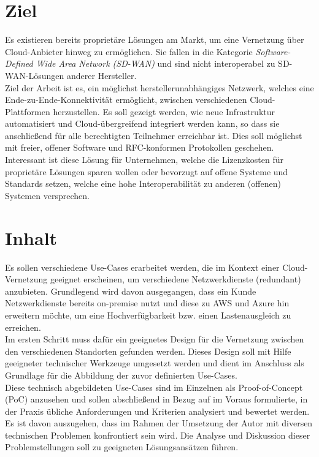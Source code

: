 \section{Ziel}

Es existieren bereits proprietäre Lösungen am Markt, um eine Vernetzung über Cloud-Anbieter hinweg zu ermöglichen. Sie fallen in die Kategorie \textit{Software-Defined Wide Area Network (SD-WAN)} und sind nicht interoperabel zu SD-WAN-Lösungen anderer Hersteller.\\
Ziel der Arbeit ist es, ein möglichst herstellerunabhängiges Netzwerk, welches eine Ende-zu-Ende-Konnektivität ermöglicht, zwischen verschiedenen Cloud-Plattformen herzustellen. Es soll gezeigt werden, wie neue Infrastruktur automatisiert und Cloud-übergreifend integriert werden kann, so dass sie anschließend für alle berechtigten Teilnehmer erreichbar ist. Dies soll möglichst mit freier, offener Software und RFC-konformen Protokollen geschehen.\\
Interessant ist diese Lösung für Unternehmen, welche die Lizenzkosten für proprietäre Lösungen sparen wollen oder bevorzugt auf offene Systeme und Standards setzen, welche eine hohe Interoperabilität zu anderen (offenen) Systemen versprechen.

\section{Inhalt}
Es sollen verschiedene Use-Cases erarbeitet werden, die im Kontext einer Cloud-Vernetzung geeignet erscheinen, um verschiedene Netzwerkdienste (redundant) anzubieten. Grundlegend wird davon ausgegangen, dass ein Kunde Netzwerkdienste bereits on-premise nutzt und diese zu AWS und Azure hin erweitern möchte, um eine Hochverfügbarkeit bzw. einen Lastenausgleich zu erreichen.\\
Im ersten Schritt muss dafür ein geeignetes Design für die Vernetzung zwischen den verschiedenen Standorten gefunden werden. Dieses Design soll mit Hilfe geeigneter technischer Werkzeuge umgesetzt werden und dient im Anschluss als Grundlage für die Abbildung der zuvor definierten Use-Cases.\\
Diese technisch abgebildeten Use-Cases sind im Einzelnen als Proof-of-Concept (PoC) anzusehen und sollen abschließend in Bezug auf im Voraus formulierte, in der Praxis übliche Anforderungen und Kriterien analysiert und bewertet werden. Es ist davon auszugehen, dass im Rahmen der Umsetzung der Autor mit diversen technischen Problemen konfrontiert sein wird. Die Analyse und Diskussion dieser Problemstellungen soll zu geeigneten Lösungsansätzen führen.

